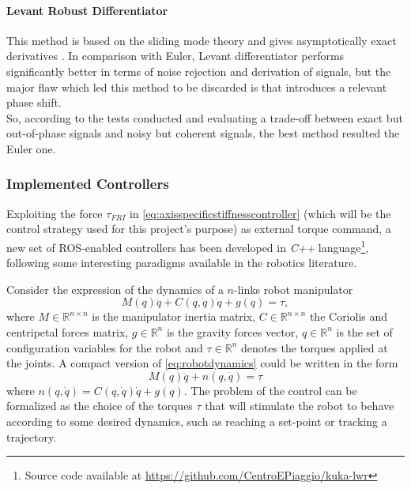 \paragraph{Levant Robust Differentiator}
This method is based on the sliding mode theory and gives asymptotically exact derivatives \cite{levant06}. In comparison with Euler, Levant differentiator performs significantly better in terms of noise rejection and derivation of signals, but the major flaw which led this method to be discarded is that introduces a relevant phase shift.\\[1em]
So, according to the tests conducted and evaluating a trade-off between exact but out-of-phase signals and noisy but coherent signals, the best method resulted the Euler one.

\subsubsection{Implemented Controllers}\nocite{siciliano09}\nocite{bicchi13}
Exploiting the force $\tau_{FRI}$ in \eqref{eq:axisspecificstiffnesscontroller} (which will be the control strategy used for this project's purpose) as external torque command, a new set of ROS-enabled controllers has been developed in \textit{C++} language\footnote{Source code available at \url{https://github.com/CentroEPiaggio/kuka-lwr}}, following some interesting paradigms available in the robotics literature.

Consider the expression of the dynamics of a $n$-links robot manipulator
\begin{equation}
M(q)\ddot{q} + C(q,\dot{q})\dot{q} + g(q) = \tau,
\label{eq:robotdynamics}
\end{equation}
where $M\in\mathbb{R}^{n \times n}$ is the manipulator inertia matrix, $C\in\mathbb{R}^{n \times n}$ the Coriolis and centripetal forces matrix, $g\in\mathbb{R}^n$ is the gravity forces vector, $q\in\mathbb{R}^n$ is the set of configuration variables for the robot and $\tau\in\mathbb{R}^n$ denotes the torques applied at the joints. A compact version of \eqref{eq:robotdynamics} could be written in the form
\begin{equation}
M(q)\ddot{q} + n(q,\dot{q}) = \tau
\label{eq:compactrobotdynamics}
\end{equation}
where $n(q,\dot{q}) = C(q,\dot{q})\dot{q} + g(q)$. The problem of the control can be formalized as the choice of the torques $ \tau $ that will stimulate the robot to behave according to some desired dynamics, such as reaching a set-point or tracking a trajectory.

